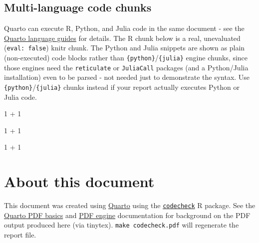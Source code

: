 \documentclass[
  letterpaper,
  DIV=11,
  numbers=noendperiod]{scrartcl}
\newenvironment{Shaded}{\begin{snugshade}}{\end{snugshade}}
\newcommand{\DecValTok}[1]{\textcolor[rgb]{0.68,0.00,0.00}{#1}}
\newcommand{\FloatTok}[1]{\textcolor[rgb]{0.68,0.00,0.00}{#1}}
\newcommand{\OperatorTok}[1]{\textcolor[rgb]{0.37,0.37,0.37}{#1}}
\newcommand{\SpecialCharTok}[1]{\textcolor[rgb]{0.37,0.37,0.37}{#1}}
\begin{document}
\subsection{Multi-language code
chunks}\label{multi-language-code-chunks}

Quarto can execute R, Python, and Julia code in the same document - see
the \href{https://quarto.org/docs/computations/languages.html}{Quarto
language guides} for details. The R chunk below is a real, unevaluated
(\texttt{eval:\ false}) knitr chunk. The Python and Julia snippets are
shown as plain (non-executed) code blocks rather than
\texttt{\{python\}}/\texttt{\{julia\}} engine chunks, since those
engines need the \texttt{reticulate} or \texttt{JuliaCall} packages (and
a Python/Julia installation) even to be parsed - not needed just to
demonstrate the syntax. Use \texttt{\{python\}}/\texttt{\{julia\}}
chunks instead if your report actually executes Python or Julia code.

\begin{Shaded}
\begin{Highlighting}[]
\DecValTok{1} \SpecialCharTok{+} \DecValTok{1}
\end{Highlighting}
\end{Shaded}

\begin{Shaded}
\begin{Highlighting}[]
\DecValTok{1} \OperatorTok{+} \DecValTok{1}
\end{Highlighting}
\end{Shaded}

\begin{Shaded}
\begin{Highlighting}[]
\FloatTok{1} \OperatorTok{+} \FloatTok{1}
\end{Highlighting}
\end{Shaded}

\section{About this document}\label{about-this-document}

This document was created using \href{https://quarto.org/}{Quarto} using
the \href{https://github.com/codecheckers/codecheck}{\texttt{codecheck}}
R package. See the
\href{https://quarto.org/docs/output-formats/pdf-basics.html}{Quarto PDF
basics} and
\href{https://quarto.org/docs/output-formats/pdf-engine.html}{PDF
engine} documentation for background on the PDF output produced here
(via tinytex). \texttt{make\ codecheck.pdf} will regenerate the report
file.
\end{document}

